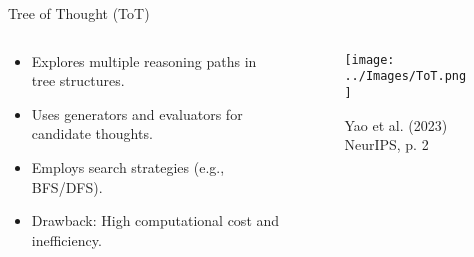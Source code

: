 \documentclass{beamer}
\begin{document}
\begin{frame}{Tree of Thought (ToT)}
    \begin{columns}
        \begin{column}{0.5 \textwidth}
            \begin{itemize}
                \item Explores multiple reasoning paths in tree structures.
                \item Uses generators and evaluators for candidate thoughts.
                \item Employs search strategies (e.g., BFS/DFS).
                \item Drawback: High computational cost and inefficiency.
            \end{itemize}
        \end{column}
        \begin{column}{0.5\textwidth}
            \begin{figure}
                \centering
                \texttt{[image: ../Images/ToT.png]}

                \vspace{0.5em}
                {\tiny Yao et al. (2023) NeurIPS, p. 2}
            \end{figure}
        \end{column}
    \end{columns}
\end{frame}
\end{document}

